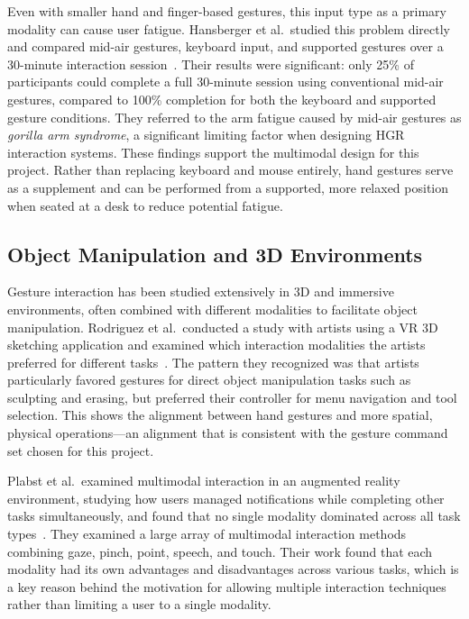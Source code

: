 \documentclass[manuscript]{acmart}
\begin{document}
Even with smaller hand and finger-based gestures, this input type as a primary modality can cause user fatigue. Hansberger et al.\ studied this problem directly and compared mid-air gestures, keyboard input, and supported gestures over a 30-minute interaction session~\cite{hansberger2017}. Their results were significant: only 25\% of participants could complete a full 30-minute session using conventional mid-air gestures, compared to 100\% completion for both the keyboard and supported gesture conditions. They referred to the arm fatigue caused by mid-air gestures as \textit{gorilla arm syndrome}, a significant limiting factor when designing HGR interaction systems. These findings support the multimodal design for this project. Rather than replacing keyboard and mouse entirely, hand gestures serve as a supplement and can be performed from a supported, more relaxed position when seated at a desk to reduce potential fatigue.

\subsection{Object Manipulation and 3D Environments}

Gesture interaction has been studied extensively in 3D and immersive environments, often combined with different modalities to facilitate object manipulation. Rodriguez et al.\ conducted a study with artists using a VR 3D sketching application and examined which interaction modalities the artists preferred for different tasks~\cite{rodriguez2024}. The pattern they recognized was that artists particularly favored gestures for direct object manipulation tasks such as sculpting and erasing, but preferred their controller for menu navigation and tool selection. This shows the alignment between hand gestures and more spatial, physical operations—an alignment that is consistent with the gesture command set chosen for this project.

Plabst et al.\ examined multimodal interaction in an augmented reality environment, studying how users managed notifications while completing other tasks simultaneously, and found that no single modality dominated across all task types~\cite{plabst2025}. They examined a large array of multimodal interaction methods combining gaze, pinch, point, speech, and touch. Their work found that each modality had its own advantages and disadvantages across various tasks, which is a key reason behind the motivation for allowing multiple interaction techniques rather than limiting a user to a single modality.
\end{document}
